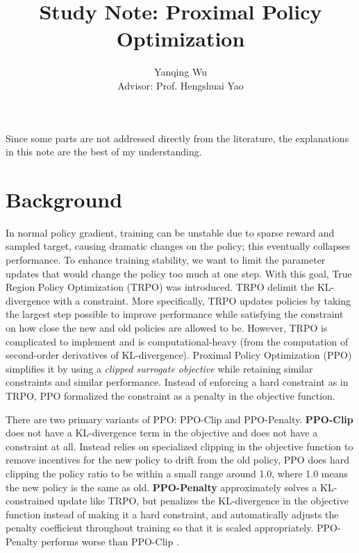 \documentclass[lang=en,mode=normal,device=normal,color=blue,12pt]{elegantnote}
\title{Study Note: Proximal Policy Optimization}
\author{Yanqing Wu\\[0.5cm]{Advisor: Prof. Hengshuai Yao}}
\institute{Viwistar Robotics}
\DeclareMathOperator*{\1}{\mathbbm{1}}
\begin{document}
\maketitle

\newpage


Since some parts are not addressed directly from the literature, the explanations in this note are the best of my understanding.

\section{Background}

In normal policy gradient, training can be unstable due to sparse reward and sampled target, causing dramatic changes on the policy; this eventually collapses performance.
To enhance training stability, we want to limit the parameter updates that would change the policy too much at one step.
With this goal, True Region Policy Optimization (TRPO) \cite{schulman2017trust} was introduced.
TRPO delimit the KL-divergence with a constraint. More specifically, TRPO updates policies by taking the largest step possible to improve performance while satisfying the constraint on how close the new and old policies are allowed to be.
However, TRPO is complicated to implement and is computational-heavy (from the computation of second-order derivatives of KL-divergence). Proximal Policy Optimization (PPO) \cite{schulman2017proximal} simplifies it by using a \textit{clipped surrogate objective} while retaining similar constraints and similar performance.
Instead of enforcing a hard constraint as in TRPO, PPO formalized the constraint as a penalty in the objective function.

There are two primary variants of PPO: PPO-Clip and PPO-Penalty.
\newline
\textbf{PPO-Clip} does not have a KL-divergence term in the objective and does not have a constraint at all. Instead relies on specialized clipping in the objective function to remove incentives for the new policy to drift from the old policy, PPO does hard clipping the policy ratio to be within a small range around 1.0, where 1.0 means the new policy is the same as old.
\newline
\textbf{PPO-Penalty} approximately solves a KL-constrained update like TRPO, but penalizes the KL-divergence in the objective function instead of making it a hard constraint, and automatically adjusts the penalty coefficient throughout training so that it is scaled appropriately.
PPO-Penalty performs worse than PPO-Clip \cite{schulman2017proximal}.
\end{document}
